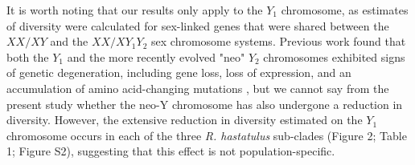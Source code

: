 \documentclass[9pt,twocolumn,twoside]{gsajnl}
\begin{document}

It is worth noting that our results only apply to the $Y_{1}$ chromosome, as estimates of diversity were calculated for sex-linked genes that were shared between the $XX/XY$ and the $XX/XY_{1}Y_{2}$ sex chromosome systems. Previous work found that both the $Y_{1}$ and the more recently evolved "neo" $Y_{2}$ chromosomes exhibited signs of genetic degeneration, including gene loss, loss of expression, and an accumulation of amino acid-changing mutations \citep{hough2014}, but we cannot say from the present study whether the neo-Y chromosome has also undergone a reduction in diversity. However, the extensive reduction in diversity estimated on the $Y_{1}$ chromosome occurs in each of the three \textit{R. hastatulus} sub-clades (\X Figure 2; Table 1; Figure S2), suggesting that this effect is not population-specific.




\end{document}

